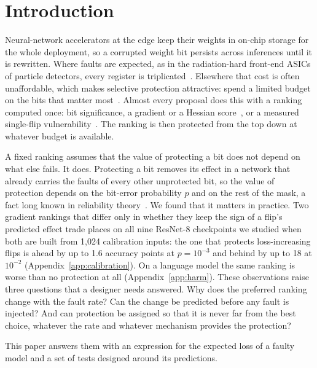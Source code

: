 \section{Introduction}\label{sec:introduction}
Neural-network accelerators at the edge keep their weights in on-chip storage for the whole deployment, so a corrupted weight bit persists across inferences until it is rewritten. Where faults are expected, as in the radiation-hard front-end ASICs of particle detectors, every register is triplicated~\cite{cummings2023econd,diguglielmo2021reconfigurable}. Elsewhere that cost is often unaffordable, which makes selective protection attractive: spend a limited budget on the bits that matter most~\cite{libano2019selective,garciabertoa2023selective,nazari2024fortune,guo2025inpixel}. Almost every proposal does this with a ranking computed once: bit significance, a gradient or a Hessian score~\cite{weng2024fkeras}, or a measured single-flip vulnerability~\cite{tyagi2023thales}. The ranking is then protected from the top down at whatever budget is available.

A fixed ranking assumes that the value of protecting a bit does not depend on what else fails. It does. Protecting a bit removes its effect in a network that already carries the faults of every other unprotected bit, so the value of protection depends on the bit-error probability $p$ and on the rest of the mask, a fact long known in reliability theory~\cite{birnbaum1969importance,rausand2004system}. We found that it matters in practice. Two gradient rankings that differ only in whether they keep the sign of a flip's predicted effect trade places on all nine ResNet-8 checkpoints we studied when both are built from 1,024 calibration inputs: the one that protects loss-increasing flips is ahead by up to 1.6 accuracy points at $p=10^{-3}$ and behind by up to 18 at $10^{-2}$ (Appendix~\ref{app:calibration}). On a language model the same ranking is worse than no protection at all (Appendix~\ref{app:harm}). These observations raise three questions that a designer needs answered. Why does the preferred ranking change with the fault rate? Can the change be predicted before any fault is injected? And can protection be assigned so that it is never far from the best choice, whatever the rate and whatever mechanism provides the protection?

This paper answers them with an expression for the expected loss of a faulty model and a set of tests designed around its predictions.

